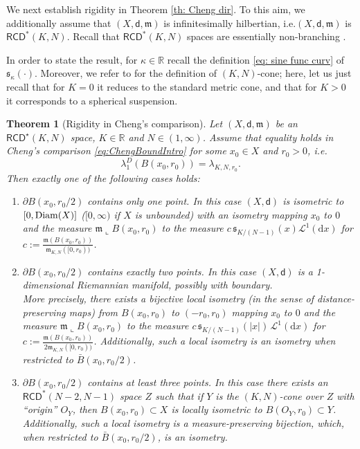 \documentclass[12pt]{article}
\newcommand{\R}{\mathbb{R}}
\newcommand{\dd}{\mathrm{d}}
\newcommand{\RCD}{\mathsf{RCD}}
\newcommand{\mm}{\mathfrak m}
\newcommand{\di}{\mathsf{d}}
\newcommand{\sfd}{\mathsf d}
\theoremstyle{plain}
\newtheorem{theorem}[lemma]{Theorem}
\theoremstyle{definition}
\begin{document}
We next establish rigidity in Theorem \ref{th: Cheng dir}. To this aim, we additionally assume that $(X,\di, \mm)$ is infinitesimally hilbertian, i.e.\;$(X,\di, \mm)$ is $\RCD^*(K,N)$.  Recall that $\RCD^*(K,N)$ spaces are essentially non-branching \cite{rajala-sturm}. 

In order to state the result, for $\kappa\in \R$ recall the definition \eqref{eq: sine func curv} of $\mathfrak{s}_\kappa(\cdot)$.
Moreover, we refer to \cite{Ket-JMPA} for the definition of $(K,N)$-cone; here, let us just recall that for $K=0$ it reduces to the standard metric cone, and that for $K>0$ it corresponds to a spherical suspension.




\begin{theorem}[Rigidity in Cheng's comparison]\label{th: Cheng dir-Rigid}
Let $(X,\di,\mm)$ be an $\RCD^{\star}(K,N)$ space, $K\in \R$ and $N\in (1,\infty)$.  Assume that equality holds in Cheng's comparison \eqref{eq:ChengBoundIntro} for some  $x_0\in X$ and $r_0>0$, i.e.
\begin{equation*}
\lambda_1^D(B(x_0,r_0))= \lambda_{K,N,r_0}.
\end{equation*} 
Then exactly one of the following cases holds:
\begin{enumerate}
\item \emph{$\partial B(x_0, r_0/2)$ contains only one point.} In this case $(X, \sfd)$ is isometric to $[0,{\rm Diam}(X)]$ ($[0,\infty)$ if $X$ is unbounded) with an isometry mapping $x_0$ to $0$ and the measure $\mm\llcorner{B(x_0, r_0)}$ to the measure $c\, \mathfrak{s}_{K/(N-1)}(x) \mathcal{L}^1(\dd x)$ for  $c:=\frac{\mm(B(x_0, r_0))}{\mm_{K,N}([0,r_0))}$.
\item  \emph{$\partial B(x_0, r_0/2)$ contains exactly two points.}  In this case $(X,\sfd)$ is a 1-dimensional Riemannian manifold, possibly with boundary. \\ More precisely, there exists a bijective local isometry (in the sense of distance-preserving maps) from $B(x_0, r_0)$ to $(-r_0, r_0)$ mapping $x_0$ to $0$ and the measure $\mm\llcorner{B(x_0, r_0)}$  to the measure $c\, \mathfrak{s}_{K/(N-1)}(|x|)\,  \mathcal{L}^1(\dd x)$ for $c:=\frac{\mm(B(x_0, r_0))}{2\mm_{K,N}([0,r_0))}$. Additionally, such a local isometry is an isometry when restricted to $\bar B(x_0, r_0/2)$.
\item \emph{$\partial B(x_0, r_0/2)$ contains at least  three points.} In this case there exists an $\RCD^*(N-2,N-1)$ space $Z$ such that if $Y$ is the $(K,N)$-cone over $Z$ with ``origin''  $O_Y$, then  $B(x_0, r_0)\subset X$  is locally isometric to $B(O_Y, r_0)\subset Y$. Additionally, such a local isometry is a measure-preserving bijection, which, when restricted to $\bar B(x_0, r_0/2)$, is an isometry.
\end{enumerate}
\end{theorem} 
\end{document}
